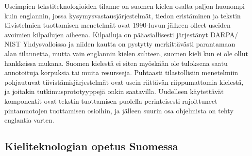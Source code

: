 \begin{multicols}{2}
Useimpien tekstiteknologioiden tilanne on suomen kielen osalta paljon
huonompi kuin englannin, jossa kysymysvastausjärjestelmät, tiedon
eristäminen ja tekstin tiivistelmien tuottamisen menetelmät ovat
1990-luvun jälkeen olleet useiden avoimien kilpailujen
aiheena. Kilpailuja on pääasiallisesti järjestänyt DARPA/ NIST
Yhdysvalloissa ja niiden kautta on pystytty merkittävästi parantamaan
alan tilannetta, mutta vain englannin kielen suhteen, suomen kieli
kun ei ole ollut hankkeissa mukana. Suomen kielestä ei siten myöskään
ole tuloksena saatu annotoituja korpuksia tai muita
resursseja. Puhtaasti tilastollisiin menetelmiin pohjautuvat
tiivistämisjärjestelmät ovat usein riittävän riippumattomia kielestä,
ja joitakin tutkimusprototyyppejä onkin saatavilla. Uudelleen
käytettävät komponentit ovat tekstin tuottamisen puolella
perinteisesti rajoittuneet pintamuotojen tuottamisen osioihin, ja
jälleen suurin osa ohjelmista on tehty englantia varten.


\subsection{Kieliteknologian opetus Suomessa}



\end{multicols}
